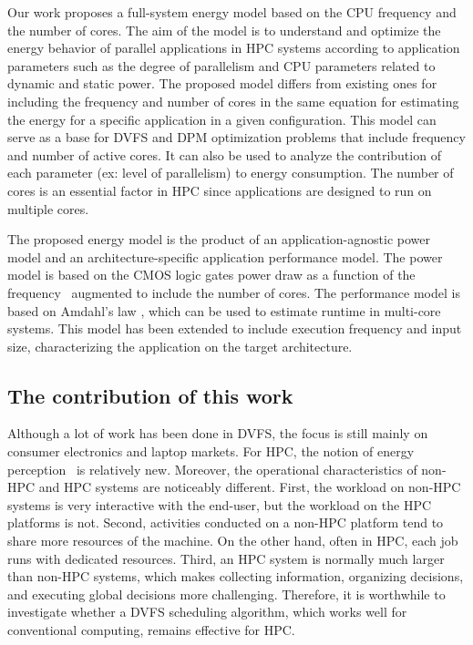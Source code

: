 Our work proposes a full-system energy model based on the CPU frequency and the number of cores.
The aim of the model is to understand and optimize the energy behavior of parallel applications in HPC systems according to application parameters such as the degree of parallelism and CPU parameters related to dynamic and static power. The proposed model differs from existing ones for including the frequency and number of cores in the same equation for estimating the energy for a specific application in a given configuration. This model can serve as a base for DVFS and DPM optimization problems that include frequency and number of active cores. It can also be used to analyze the contribution of each parameter (ex: level of parallelism) to energy consumption. The number of cores is an essential factor in HPC since applications are designed to run on multiple cores.

The proposed energy model is the product of an application-agnostic power model and an architecture-specific application performance model. The power model is based on the CMOS logic gates power draw as a function of the frequency~\cite{Sarwar1997, Butzen2007} augmented to include the number of cores. The performance model is based on Amdahl's law \cite{Amdahl1967ValidityCapabilities, Eyerman2010ModelingDesign, Shi2015ReevaluatingLaw}, which can be used to estimate runtime in multi-core systems. This model has been extended to include execution frequency and input size, characterizing the application on the target architecture.


\subsection{The contribution of this work}
Although a lot of work has been done in DVFS, the focus is still mainly on consumer electronics and laptop markets. For HPC, the notion of energy perception~\cite{Beckman2005MakingSupercomputing} is relatively new. Moreover, the operational characteristics of non-HPC and HPC systems are noticeably different. First, the workload on non-HPC systems is very interactive with the end-user, but the workload on the HPC platforms is not. Second, activities conducted on a non-HPC platform tend to share more resources of the machine. On the other hand, often in HPC, each job runs with dedicated resources. Third, an HPC system is normally much larger than non-HPC systems, which makes collecting information, organizing decisions, and executing global decisions more challenging. Therefore, it is worthwhile to investigate whether a DVFS scheduling algorithm, which works well for conventional computing, remains effective for HPC.

